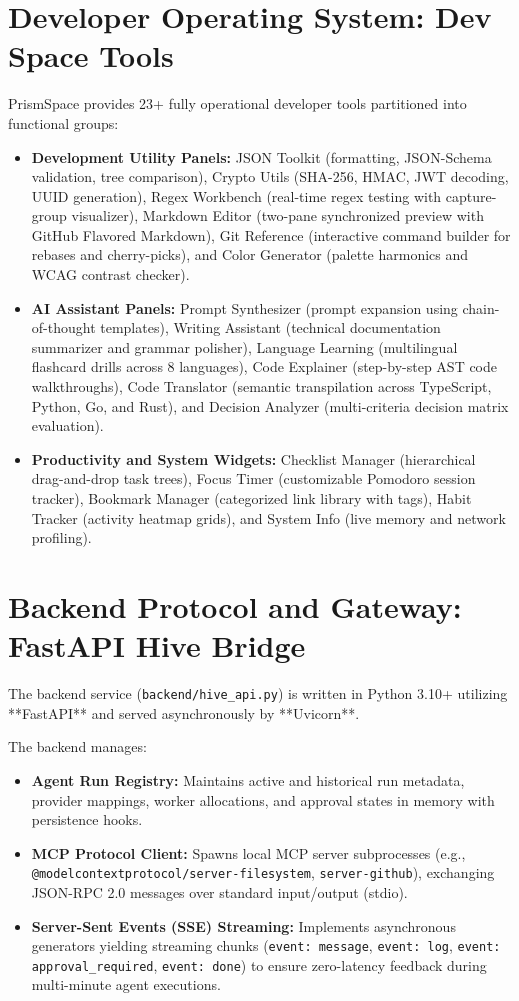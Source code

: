\documentclass[12pt,a4paper]{report}
\begin{document}
\section{Developer Operating System: Dev Space Tools}
PrismSpace provides 23+ fully operational developer tools partitioned into functional groups:
\begin{itemize}
    \item \textbf{Development Utility Panels:} JSON Toolkit (formatting, JSON-Schema validation, tree comparison), Crypto Utils (SHA-256, HMAC, JWT decoding, UUID generation), Regex Workbench (real-time regex testing with capture-group visualizer), Markdown Editor (two-pane synchronized preview with GitHub Flavored Markdown), Git Reference (interactive command builder for rebases and cherry-picks), and Color Generator (palette harmonics and WCAG contrast checker).
    \item \textbf{AI Assistant Panels:} Prompt Synthesizer (prompt expansion using chain-of-thought templates), Writing Assistant (technical documentation summarizer and grammar polisher), Language Learning (multilingual flashcard drills across 8 languages), Code Explainer (step-by-step AST code walkthroughs), Code Translator (semantic transpilation across TypeScript, Python, Go, and Rust), and Decision Analyzer (multi-criteria decision matrix evaluation).
    \item \textbf{Productivity and System Widgets:} Checklist Manager (hierarchical drag-and-drop task trees), Focus Timer (customizable Pomodoro session tracker), Bookmark Manager (categorized link library with tags), Habit Tracker (activity heatmap grids), and System Info (live memory and network profiling).
\end{itemize}

\section{Backend Protocol and Gateway: FastAPI Hive Bridge}
The backend service (\texttt{backend/hive\_api.py}) is written in Python 3.10+ utilizing **FastAPI** and served asynchronously by **Uvicorn**.

The backend manages:
\begin{itemize}
    \item \textbf{Agent Run Registry:} Maintains active and historical run metadata, provider mappings, worker allocations, and approval states in memory with persistence hooks.
    \item \textbf{MCP Protocol Client:} Spawns local MCP server subprocesses (e.g., \texttt{@modelcontextprotocol/server-filesystem}, \texttt{server-github}), exchanging JSON-RPC 2.0 messages over standard input/output (stdio).
    \item \textbf{Server-Sent Events (SSE) Streaming:} Implements asynchronous generators yielding streaming chunks (\texttt{event: message}, \texttt{event: log}, \texttt{event: approval\_required}, \texttt{event: done}) to ensure zero-latency feedback during multi-minute agent executions.
\end{itemize}
\end{document}
